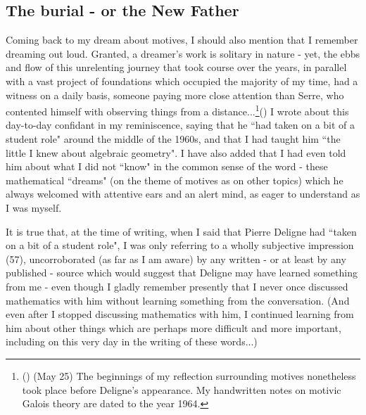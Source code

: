\subsection{The burial - or the New Father}

\label{note:52} Coming back to my dream about motives, I should also mention that I remember dreaming out loud. Granted, a dreamer's work is solitary in nature - yet, the ebbs and flow of this unrelenting journey that took course over the years, in parallel with a vast project of foundations which occupied the majority of my time, had a witness on a daily basis, someone paying more close attention than Serre, who contented himself with observing things from a distance...\footnote{() (May 25) The beginnings of my reflection surrounding motives nonetheless took place before Deligne's appearance. My handwritten notes on motivic Galois theory are dated to the year 1964.}() I wrote about this day-to-day confidant in my reminiscence, saying that he ``had taken on a bit of a student role" around the middle of the 1960s, and that I had taught him ``the little I knew about algebraic geometry". I have also added that I had even told him about what I did not ``know" in the common sense of the word - these mathematical ``dreams" (on the theme of motives as on other topics) which he always welcomed with attentive ears and an alert mind, as eager to understand as I was myself.

It is true that, at the time of writing, when I said that Pierre Deligne had ``taken on a bit of a student role", I was only referring to a wholly subjective impression (57), uncorroborated (as far as I am aware) by any written - or at least by any published - source which would suggest that Deligne may have learned something from me - even though I gladly remember presently that I never once discussed mathematics with him without learning something from the conversation. (And even after I stopped discussing mathematics with him, I continued learning from him about other things which are perhaps more difficult and more important, including on this very day in the writing of these words...)

